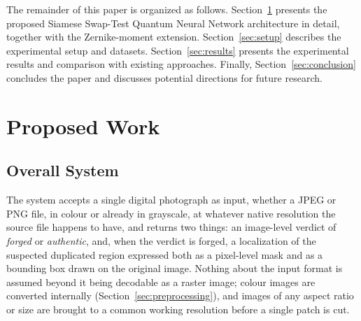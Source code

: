 \documentclass[conference]{IEEEtran}
\begin{document}
The remainder of this paper is organized as follows. Section~\ref{sec:proposed} presents the proposed Siamese Swap-Test Quantum Neural Network architecture in detail, together with the Zernike-moment extension. Section~\ref{sec:setup} describes the experimental setup and datasets. Section~\ref{sec:results} presents the experimental results and comparison with existing approaches. Finally, Section~\ref{sec:conclusion} concludes the paper and discusses potential directions for future research.

\section{Proposed Work}\label{sec:proposed}

\subsection{Overall System}\label{sec:overall}
The system accepts a single digital photograph as input, whether a JPEG or PNG file, in colour or already in grayscale, at whatever native resolution the source file happens to have, and returns two things: an image-level verdict of \emph{forged} or \emph{authentic}, and, when the verdict is forged, a localization of the suspected duplicated region expressed both as a pixel-level mask and as a bounding box drawn on the original image. Nothing about the input format is assumed beyond it being decodable as a raster image; colour images are converted internally (Section~\ref{sec:preprocessing}), and images of any aspect ratio or size are brought to a common working resolution before a single patch is cut.
\end{document}
